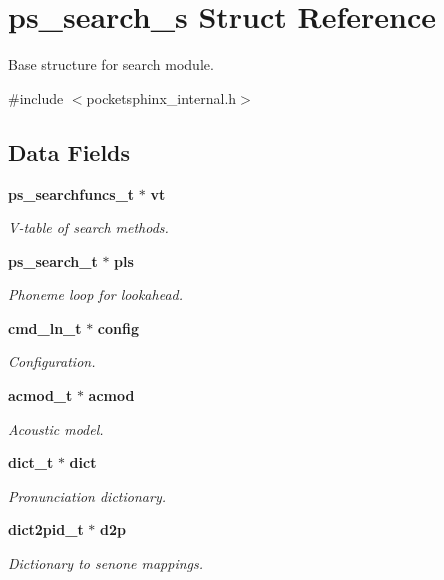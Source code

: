 \section{ps\-\_\-search\-\_\-s \-Struct \-Reference}
\label{structps__search__s}


\-Base structure for search module.  




{\ttfamily \#include $<$pocketsphinx\-\_\-internal.\-h$>$}

\subsection*{\-Data \-Fields}
\begin{DoxyCompactItemize}
\item 
{\bf ps\-\_\-searchfuncs\-\_\-t} $\ast$ {\bf vt}
\begin{DoxyCompactList}\small\item\em \-V-\/table of search methods. \end{DoxyCompactList}\item 
{\bf ps\-\_\-search\-\_\-t} $\ast$ {\bf pls}
\begin{DoxyCompactList}\small\item\em \-Phoneme loop for lookahead. \end{DoxyCompactList}\item 
{\bf cmd\-\_\-ln\-\_\-t} $\ast$ {\bf config}
\begin{DoxyCompactList}\small\item\em \-Configuration. \end{DoxyCompactList}\item 
{\bf acmod\-\_\-t} $\ast$ {\bf acmod}
\begin{DoxyCompactList}\small\item\em \-Acoustic model. \end{DoxyCompactList}\item 
{\bf dict\-\_\-t} $\ast$ {\bf dict}
\begin{DoxyCompactList}\small\item\em \-Pronunciation dictionary. \end{DoxyCompactList}\item 
{\bf dict2pid\-\_\-t} $\ast$ {\bf d2p}
\begin{DoxyCompactList}\small\item\em \-Dictionary to senone mappings. \end{DoxyCompactList}\item 

\end{DoxyCompactItemize}
